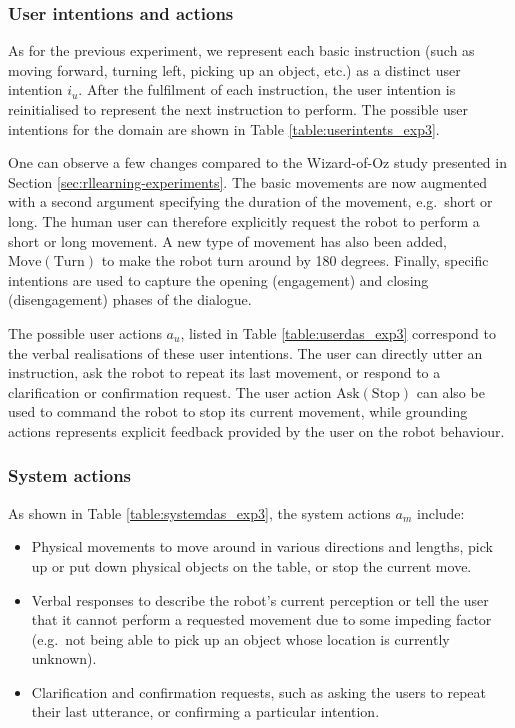 \subsubsection*{User intentions and actions}

As for the previous experiment, we represent each basic instruction (such as moving forward, turning left, picking up an object, etc.) as a distinct user intention $i_u$. After the fulfilment of each instruction, the user intention is reinitialised to represent the next instruction to perform.  The possible user intentions for the domain are shown in Table \ref{table:userintents_exp3}.  


One can observe a few changes compared to the Wizard-of-Oz study presented in Section \ref{sec:rllearning-experiments}. The basic movements are now augmented with a second argument specifying the duration of the movement, e.g.\ short or long. The human user can therefore explicitly request the robot to perform a short or long movement. A new type of movement has also been added, $\mathrm{Move(Turn)}$ to make the robot turn around by 180 degrees.  Finally, specific intentions are used to capture the opening (engagement) and closing (disengagement) phases of the dialogue. 

The possible user actions $a_u$, listed in Table \ref{table:userdas_exp3} correspond to the verbal realisations of these user intentions. The user can directly utter an instruction, ask the robot to repeat its last movement, or respond to a clarification or confirmation request.   The user action $\mathrm{Ask(Stop)}$ can also be used to command the robot to stop its current movement, while grounding actions represents explicit  feedback provided by the user on the robot behaviour.

\subsubsection*{System actions}
As shown in Table \ref{table:systemdas_exp3}, the system actions $a_m$ include: \begin{itemize}
\item Physical movements to move around in various directions and lengths, pick up or put down physical objects on the table, or stop the current move.
\item Verbal responses to describe the robot's current perception or tell the user that it cannot perform a requested movement due to some impeding factor (e.g.\ not being able to pick up an object whose location is currently unknown). 
\item Clarification and confirmation requests, such as asking the users to repeat their last utterance, or confirming a particular intention.
\end{itemize}

